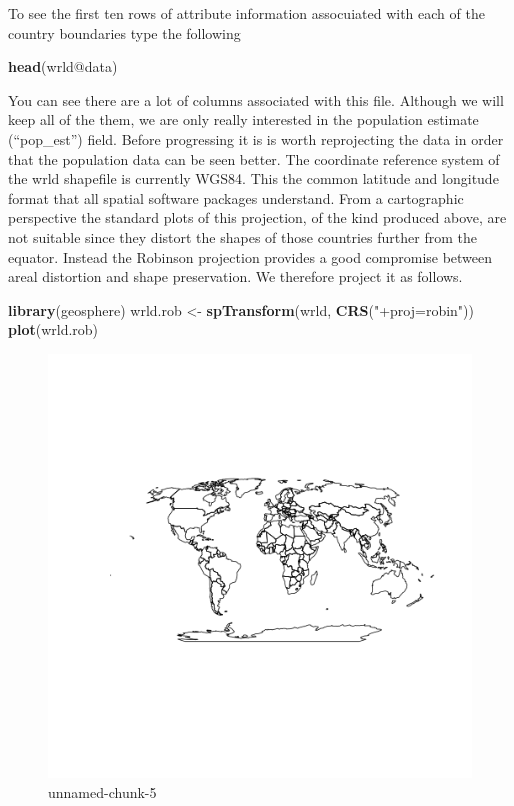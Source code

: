 \documentclass[]{article}
\makeatletter
\newenvironment{Shaded}{}{}
\newcommand{\KeywordTok}[1]{\textcolor[rgb]{0.00,0.44,0.13}{\textbf{{#1}}}}
\newcommand{\StringTok}[1]{\textcolor[rgb]{0.25,0.44,0.63}{{#1}}}
\newcommand{\NormalTok}[1]{{#1}}
\def\maxwidth{\ifdim\Gin@nat@width>\linewidth\linewidth
\else\Gin@nat@width\fi}
\let\Oldincludegraphics\includegraphics
\renewcommand{\includegraphics}[1]{\Oldincludegraphics[width=\maxwidth]{#1}}
\makeatother
\begin{document}
To see the first ten rows of attribute information assocuiated with each
of the country boundaries type the following

\begin{Shaded}
\begin{Highlighting}[]
\KeywordTok{head}\NormalTok{(wrld@data)}
\end{Highlighting}
\end{Shaded}

You can see there are a lot of columns associated with this file.
Although we will keep all of the them, we are only really interested in
the population estimate (``pop\_est'') field. Before progressing it is
is worth reprojecting the data in order that the population data can be
seen better. The coordinate reference system of the wrld shapefile is
currently WGS84. This the common latitude and longitude format that all
spatial software packages understand. From a cartographic perspective
the standard plots of this projection, of the kind produced above, are
not suitable since they distort the shapes of those countries further
from the equator. Instead the Robinson projection provides a good
compromise between areal distortion and shape preservation. We therefore
project it as follows.

\begin{Shaded}
\begin{Highlighting}[]
\KeywordTok{library}\NormalTok{(geosphere)}
\NormalTok{wrld.rob <-}\StringTok{ }\KeywordTok{spTransform}\NormalTok{(wrld, }\KeywordTok{CRS}\NormalTok{(}\StringTok{"+proj=robin"}\NormalTok{))}
\KeywordTok{plot}\NormalTok{(wrld.rob)}
\end{Highlighting}
\end{Shaded}

\begin{figure}[htbp]
\centering
\includegraphics{figure/unnamed-chunk-5.png}
\caption{unnamed-chunk-5}
\end{figure}
\end{document}
